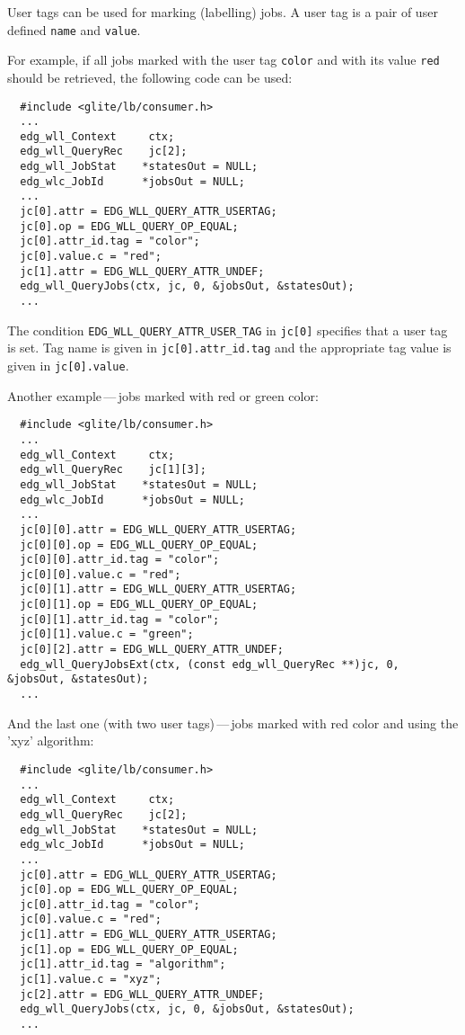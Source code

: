 \label{JQ_ut}
User tags can be used for marking (labelling) jobs. A user tag is
a pair of user defined \texttt{name} and \texttt{value}. 

\label{JQ_RedJobs}
For example, if all jobs marked with the user tag \texttt{color} and with its
value \texttt{red} should be retrieved, the following code can  be used:
\begin{verbatim}
  #include <glite/lb/consumer.h>
  ...
  edg_wll_Context     ctx;    
  edg_wll_QueryRec    jc[2];
  edg_wll_JobStat    *statesOut = NULL;
  edg_wlc_JobId      *jobsOut = NULL;
  ...
  jc[0].attr = EDG_WLL_QUERY_ATTR_USERTAG;
  jc[0].op = EDG_WLL_QUERY_OP_EQUAL;
  jc[0].attr_id.tag = "color";
  jc[0].value.c = "red";
  jc[1].attr = EDG_WLL_QUERY_ATTR_UNDEF;
  edg_wll_QueryJobs(ctx, jc, 0, &jobsOut, &statesOut);
  ...
\end{verbatim}
The condition \texttt{EDG\_WLL\_QUERY\_ATTR\_USER\_TAG} in \texttt{jc[0]}
specifies that a user tag is set. Tag name is given in
\texttt{jc[0].attr\_id.tag} and the appropriate tag
value is given in \texttt{jc[0].value}.


Another example\,---\,jobs marked with red or green color:
\begin{verbatim}
  #include <glite/lb/consumer.h>
  ...
  edg_wll_Context     ctx;    
  edg_wll_QueryRec    jc[1][3];
  edg_wll_JobStat    *statesOut = NULL;
  edg_wlc_JobId      *jobsOut = NULL;
  ...
  jc[0][0].attr = EDG_WLL_QUERY_ATTR_USERTAG;
  jc[0][0].op = EDG_WLL_QUERY_OP_EQUAL;
  jc[0][0].attr_id.tag = "color";
  jc[0][0].value.c = "red";
  jc[0][1].attr = EDG_WLL_QUERY_ATTR_USERTAG;
  jc[0][1].op = EDG_WLL_QUERY_OP_EQUAL;
  jc[0][1].attr_id.tag = "color";
  jc[0][1].value.c = "green";
  jc[0][2].attr = EDG_WLL_QUERY_ATTR_UNDEF;
  edg_wll_QueryJobsExt(ctx, (const edg_wll_QueryRec **)jc, 0, &jobsOut, &statesOut);
  ...
\end{verbatim}

And the last one (with two user tags)\,---\,jobs marked with red color and using the 'xyz' algorithm:
\begin{verbatim}
  #include <glite/lb/consumer.h>
  ...
  edg_wll_Context     ctx;    
  edg_wll_QueryRec    jc[2];
  edg_wll_JobStat    *statesOut = NULL;
  edg_wlc_JobId      *jobsOut = NULL;
  ...
  jc[0].attr = EDG_WLL_QUERY_ATTR_USERTAG;
  jc[0].op = EDG_WLL_QUERY_OP_EQUAL;
  jc[0].attr_id.tag = "color";
  jc[0].value.c = "red";
  jc[1].attr = EDG_WLL_QUERY_ATTR_USERTAG;
  jc[1].op = EDG_WLL_QUERY_OP_EQUAL;
  jc[1].attr_id.tag = "algorithm";
  jc[1].value.c = "xyz";
  jc[2].attr = EDG_WLL_QUERY_ATTR_UNDEF;
  edg_wll_QueryJobs(ctx, jc, 0, &jobsOut, &statesOut);
  ...
\end{verbatim}

